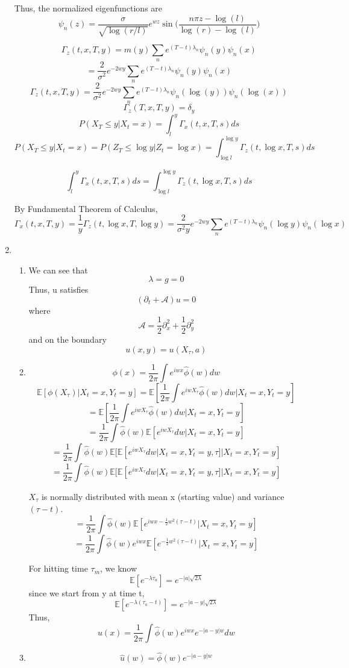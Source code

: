 \documentclass[a4paper,11pt]{article}
\begin{document}
\begin{enumerate}
Thus, the normalized eigenfunctions are
\[\psi_n(z)=\frac{\sigma}{\sqrt{\log(r/l)}} e^{wz} \sin\bigg(\frac{n\pi z - \log(l)}{\log(r)-\log(l)}\bigg)\]


\[\Gamma_z(t,x,T,y)=m(y) \sum_n e^{(T-t) \lambda_n}\psi_n(y)\psi_n(x)\]
\[=\frac{2}{\sigma^2}e^{-2wy} \sum_n e^{(T-t) \lambda_n}\psi_n(y)\psi_n(x)\]
\[\Gamma_z(t,x,T,y)=\frac{2}{\sigma^2}e^{-2wy} \sum_n e^{(T-t) \lambda_n}\psi_n(\log(y))\psi_n(\log(x))\]
\[\Gamma_z(T,x,T,y)=\delta_y\]
\[P(X_T \leq y| X_t=x) = \int_l^y \Gamma_x(t,x,T,s)ds\]
\[P(X_T \leq y| X_t=x) =P(Z_T \leq \log y| Z_t=\log x) = \int_{\log l}^{\log y} \Gamma_z(t,\log x,T,s)ds\]

\[\int_l^y \Gamma_x(t,x,T,s)ds =\int_{\log l}^{\log y} \Gamma_z(t,\log x,T,s)ds\]

By Fundamental Theorem of Calculus,
\[\Gamma_x(t,x,T,y) =\frac{1}{y} \Gamma_z(t,\log x,T,\log y)=\frac{2}{\sigma^2y}e^{-2wy} \sum_n e^{(T-t) \lambda_n}\psi_n(\log y)\psi_n(\log x)\]


\item 
\begin{enumerate}
\item 
We can see that 
\[\lambda = g = 0\]
Thus, u satisfies
\[(\partial_t + \mathcal{A})u =0 \]
where
\[\mathcal{A} = \frac{1}{2}\partial_x^2+ \frac{1}{2}\partial_y^2\]
and on the boundary
\[u(x,y)= u(X_\tau,a)\]

\item
\[\phi(x) = \frac{1}{2\pi}\int e^{iwx}\hat{\phi}(w)dw\]
\[\mathbb{E}[\phi(X_\tau)|X_t=x, Y_t=y ]= \mathbb{E}[\frac{1}{2\pi}\int e^{iwX_\tau}\hat{\phi}(w)dw|X_t=x, Y_t=y ] \]
\[= \mathbb{E}[\frac{1}{2\pi}\int e^{iwX_\tau}\hat{\phi}(w)dw|X_t=x, Y_t=y ] \]
\[= \frac{1}{2\pi} \int \hat{\phi}(w)  \mathbb{E}[ e^{iwX_\tau}dw|X_t=x, Y_t=y ] \]
\[= \frac{1}{2\pi}\int \hat{\phi}(w) \mathbb{E}[\mathbb{E}[ e^{iwX_\tau}dw|X_t=x, Y_t=y, \tau ]|X_t=x, Y_t=y ] \]
\[= \frac{1}{2\pi}\int \hat{\phi}(w) \mathbb{E}[\mathbb{E}[ e^{iwX_\tau}dw|X_t=x, Y_t=y, \tau ]|X_t=x, Y_t=y ] \]

$X_\tau$  is normally distributed with mean x (starting value) and variance $(\tau-t)$.
\[= \frac{1}{2\pi}\int \hat{\phi}(w)  \mathbb{E}[e^{iwx -\frac{1}{2}w^2(\tau-t)}|X_t=x, Y_t=y ] \]
\[= \frac{1}{2\pi}\int \hat{\phi}(w)  e^{iwx }\mathbb{E}[e^{-\frac{1}{2}w^2(\tau-t)}|X_t=x, Y_t=y ] \]

For hitting time $\tau_m$, we know
\[\mathbb{E}[e^{-\lambda\tau_a}]= e^{-|a| \sqrt{2\lambda}}\]
since we start from y at time t,
\[\mathbb{E}[e^{-\lambda(\tau_a-t)}]= e^{-|a-y| \sqrt{2\lambda}}\]
Thus,
\[u(x)= \frac{1}{2\pi}\int \hat{\phi}(w)  e^{iwx }e^{-|a-y|w}dw \]
\item
\[\hat{u}(w)=  \hat{\phi}(w)  e^{-|a-y|w} \]

\end{enumerate}

\end{enumerate}
\end{document}
